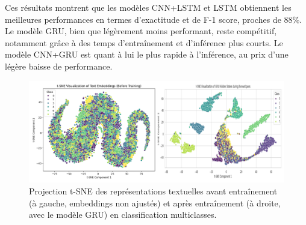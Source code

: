 \documentclass[12pt]{report}
\begin{document}
\begin{table}[H]
\centering
{}
\caption{Performances des modèles avec embeddings appris depuis zéro sur l’ensemble de test en classification multiclasses.}
\label{tab:performances_multiclass}
\end{table}

Ces résultats montrent que les modèles CNN+LSTM et LSTM obtiennent les meilleures performances en termes d’exactitude et de F-1 score, proches de 88\%. Le modèle GRU, bien que légèrement moins performant, reste compétitif, notamment grâce à des temps d’entraînement et d’inférence plus courts. Le modèle CNN+GRU est quant à lui le plus rapide à l’inférence, au prix d’une légère baisse de performance.

\begin{figure}[H]
\centering
\includegraphics[width=0.7\linewidth]{no_embed_Multi_tsne_gru.png}
\caption{Projection t-SNE des représentations textuelles avant entraînement (à gauche, embeddings non ajustés) et après entraînement (à droite, avec le modèle GRU) en classification multiclasses.}
\label{fig:no_embed_Multi_tsne_gru}
\end{figure}
\end{document}
